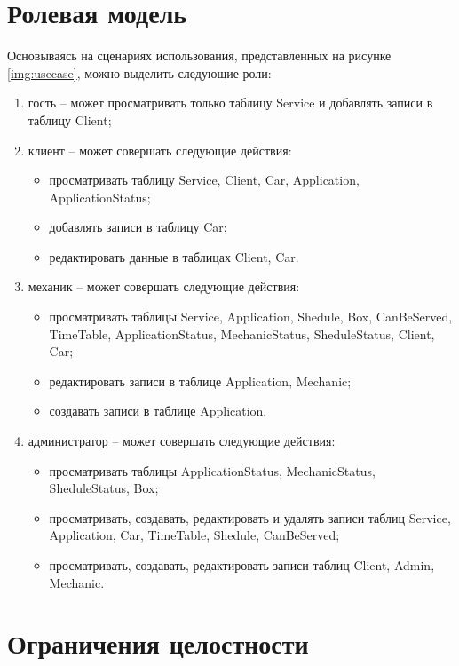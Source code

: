 \section{Ролевая модель}

Основываясь на сценариях использования, представленных на рисунке \ref{img:usecase}, можно выделить следующие роли:

\begin{enumerate}
	\item гость -- может просматривать только таблицу Service и добавлять записи в таблицу Client;
	\item клиент -- может совершать следующие действия:
	\begin{itemize}
		\item просматривать таблицу Service, Client, Car, Application, ApplicationStatus; 
		\item добавлять записи в таблицу Car;
		\item редактировать данные в таблицах Client, Car.
	\end{itemize}
	\item механик -- может совершать следующие действия:
		\begin{itemize}
		\item просматривать таблицы Service, Application, Shedule, Box, CanBeServed, TimeTable, ApplicationStatus, MechanicStatus, SheduleStatus, Client, Car; 
		\item редактировать записи в таблице Application, Mechanic;
		\item создавать записи в таблице Application.
	\end{itemize}
		\item администратор -- может совершать следующие действия:
	\begin{itemize}
		\item просматривать таблицы ApplicationStatus, MechanicStatus, SheduleStatus, Box;
		\item просматривать, создавать, редактировать и удалять записи таблиц Service, Application, Car, TimeTable, Shedule, CanBeServed;
		\item просматривать, создавать, редактировать записи таблиц Client, Admin, Mechanic.
	\end{itemize}
\end{enumerate}

\section{Ограничения целостности}

